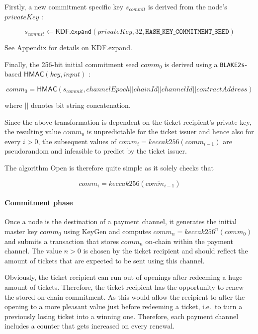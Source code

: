 Firstly, a new commitment specific key $s_{commit}$ is derived from the node's $privateKey$ :

$$ s_{commit} \longleftarrow \mathsf{KDF.expand}(privateKey, 32, \texttt{HASH\_KEY\_COMMITMENT\_SEED})$$

See Appendix for details on \textsf{KDF.expand}.

Finally, the 256-bit initial commitment seed $comm_0$ is derived using a \texttt{BLAKE2s}-based $\mathsf{HMAC}(key, input)$ :

$$ comm_0 = \mathsf{HMAC}(s_{commit}, channelEpoch || chainId || channelId || contractAddress)$$

where $||$ denotes bit string concatenation.

Since the above transformation is dependent on the ticket recipient's private key, the resulting value $comm_0$ is unpredictable for the ticket issuer and
hence also for every $i > 0$, the subsequent values of $comm_i = keccak256(comm_{i-1})$ are pseudorandom and infeasible to predict by the ticket issuer.

The algorithm \textsf{Open} is therefore quite simple as it solely checks that

$$ comm_i = keccak256 (\widetilde{comm_{i-1}}) $$

\paragraph{Commitment phase}
\label{sec:incentives:commitment:commitmentphase}

Once a node is the destination of a payment channel, it generates the initial master key $comm_0$ using \textsf{KeyGen} and computes $comm_n = keccak256^n(comm_0)$ and submits a transaction that stores $comm_n$ on-chain within the payment channel.
The value $n > 0$ is chosen by the ticket recipient and should reflect the amount of tickets that are expected to be sent using this channel.

Obviously, the ticket recipient can run out of openings after redeeming a huge amount of tickets.
Therefore, the ticket recipient has the opportunity to renew the stored on-chain commitment.
As this would allow the recipient to alter the opening to a more pleasant value just before redeeming a ticket, i.e.\ to turn a previously losing ticket into a winning one.
Therefore, each payment channel includes a counter that gets increased on every renewal.

